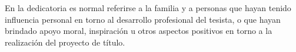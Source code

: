 En la dedicatoria es normal referirse a la familia y a personas que hayan tenido influencia personal en torno al desarrollo profesional del tesista, o que hayan brindado apoyo moral, inspiración u otros aspectos positivos en torno a la realización del proyecto de título.
